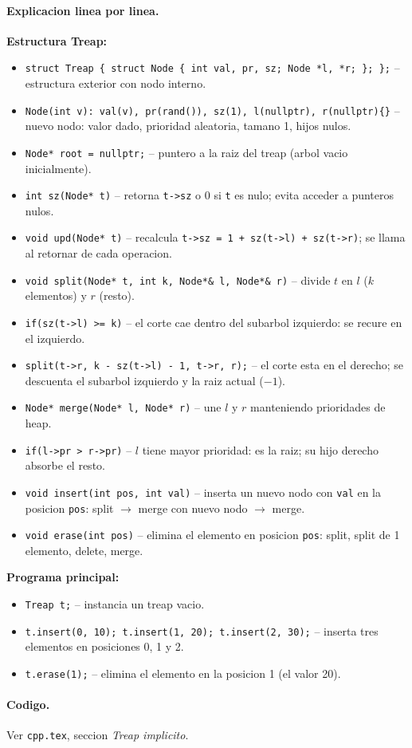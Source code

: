\paragraph{Explicacion linea por linea.}
\textbf{Estructura Treap:}
\begin{itemize}\setlength\itemsep{0pt}
	\item \verb|struct Treap { struct Node { int val, pr, sz; Node *l, *r; }; };| -- estructura exterior con nodo interno.
	\item \verb|Node(int v): val(v), pr(rand()), sz(1), l(nullptr), r(nullptr){}| -- nuevo nodo: valor dado, prioridad aleatoria, tamano 1, hijos nulos.
	\item \verb|Node* root = nullptr;| -- puntero a la raiz del treap (arbol vacio inicialmente).
	\item \verb|int sz(Node* t)| -- retorna \verb|t->sz| o 0 si \verb|t| es nulo; evita acceder a punteros nulos.
	\item \verb|void upd(Node* t)| -- recalcula \verb|t->sz = 1 + sz(t->l) + sz(t->r)|; se llama al retornar de cada operacion.
	\item \verb|void split(Node* t, int k, Node*& l, Node*& r)| -- divide $t$ en $l$ ($k$ elementos) y $r$ (resto).
	\item \verb|if(sz(t->l) >= k)| -- el corte cae dentro del subarbol izquierdo: se recure en el izquierdo.
	\item \verb|split(t->r, k - sz(t->l) - 1, t->r, r);| -- el corte esta en el derecho; se descuenta el subarbol izquierdo y la raiz actual ($-1$).
	\item \verb|Node* merge(Node* l, Node* r)| -- une $l$ y $r$ manteniendo prioridades de heap.
	\item \verb|if(l->pr > r->pr)| -- $l$ tiene mayor prioridad: es la raiz; su hijo derecho absorbe el resto.
	\item \verb|void insert(int pos, int val)| -- inserta un nuevo nodo con \verb|val| en la posicion \verb|pos|: split $\to$ merge con nuevo nodo $\to$ merge.
	\item \verb|void erase(int pos)| -- elimina el elemento en posicion \verb|pos|: split, split de 1 elemento, delete, merge.
\end{itemize}
\textbf{Programa principal:}
\begin{itemize}\setlength\itemsep{0pt}
	\item \verb|Treap t;| -- instancia un treap vacio.
	\item \verb|t.insert(0, 10); t.insert(1, 20); t.insert(2, 30);| -- inserta tres elementos en posiciones 0, 1 y 2.
	\item \verb|t.erase(1);| -- elimina el elemento en la posicion 1 (el valor 20).
\end{itemize}

\paragraph{Codigo.}
Ver \texttt{cpp.tex}, seccion \textit{Treap implicito}.

\vspace{0.5em}

